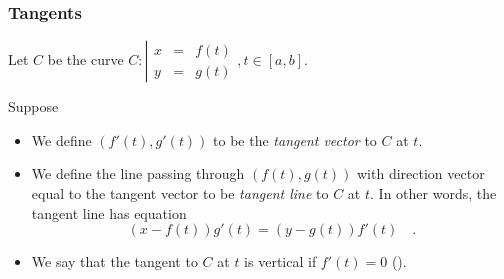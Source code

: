 \begin{frame}
\frametitle{Tangents}
Let $C $ be the curve $C:\left|\begin{array}{rcl}x&=&f(t)\\y&=&g(t)\end{array} \right., t\in [a,b]$.
\begin{definition}
Suppose 
\begin{itemize}
\item  We define $(f'(t), g'(t))$ to be the \emph{tangent vector} to $C$ at $t$.
\item<2->  We define the line passing through $(f(t), g(t))$ with direction vector equal to the tangent vector to be \emph{tangent line} to $C$ at $t$. In other words, the tangent line has equation
\[
(x-f(t))g'(t) =(y-g(t))f'(t)\quad .
\]
\item<3->  We say that the tangent to $C$ at $t$ is vertical if $f'(t)=0$ ().
\end{itemize}
\end{definition}
\end{frame}

